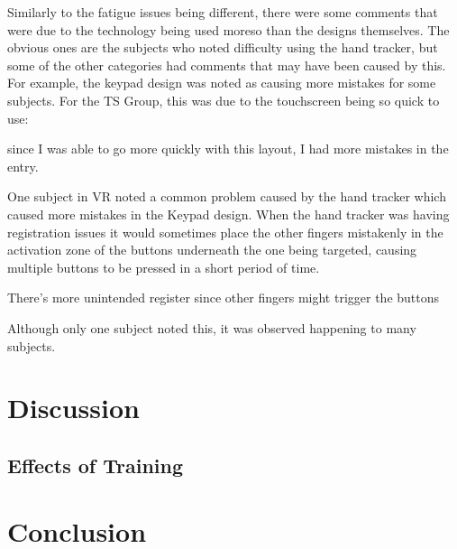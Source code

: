 Similarly to the fatigue issues being different, there were some comments that were due to the technology being used moreso than the designs themselves.
The obvious ones are the subjects who noted difficulty using the hand tracker, but some of the other categories had comments that may have been caused by this.
For example, the keypad design was noted as causing more mistakes for some subjects.
For the TS Group, this was due to the touchscreen being so quick to use:
\begin{displayquote}[TS Subject]
    since I was able to go more quickly with this layout, I had more mistakes in the entry.
\end{displayquote}
One subject in VR noted a common problem caused by the hand tracker which caused more mistakes in the Keypad design.
When the hand tracker was having registration issues it would sometimes place the other fingers mistakenly in the activation zone of the buttons underneath the one being targeted, causing multiple buttons to be pressed in a short period of time.
\begin{displayquote}[VR Subject]
    There's more unintended register since other fingers might trigger the buttons
\end{displayquote}
Although only one subject noted this, it was observed happening to many subjects.


\section{Discussion}


\subsection{Effects of Training}


\section{Conclusion}
